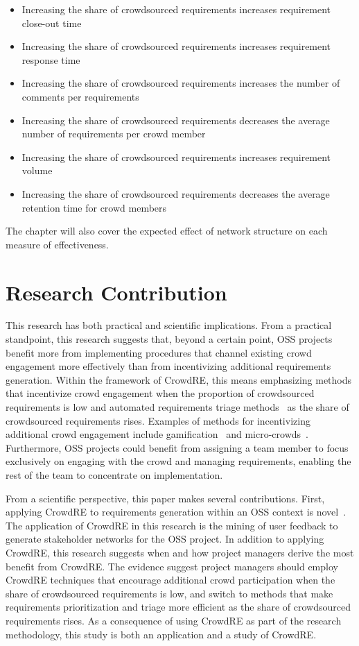 \begin{itemize}
    \item Increasing the share of crowdsourced requirements increases requirement close-out time
    \item Increasing the share of crowdsourced requirements increases requirement response time
    \item Increasing the share of crowdsourced requirements increases the number of comments per requirements
    \item Increasing the share of crowdsourced requirements decreases the average number of requirements per crowd member
    \item Increasing the share of crowdsourced requirements increases requirement volume
    \item Increasing the share of crowdsourced requirements decreases the average retention time for crowd members
\end{itemize}

The chapter will also cover the expected effect of network structure on each measure of effectiveness.

\section{Research Contribution}

This research has both practical and scientific implications. From a practical standpoint, this research suggests that, beyond a certain point, OSS projects benefit more from implementing procedures that channel existing crowd engagement more effectively than from incentivizing additional requirements generation. Within the framework of CrowdRE, this means emphasizing methods that incentivize crowd engagement when the proportion of crowdsourced requirements is low and automated requirements triage methods~\cite{stakesource, mobasher} as the share of crowdsourced requirements rises. Examples of methods for incentivizing additional crowd engagement include gamification~\cite{snijders, snijders2} and micro-crowds~\cite{levy}. Furthermore, OSS projects could benefit from assigning a team member to focus exclusively on engaging with the crowd and managing requirements, enabling the rest of the team to concentrate on implementation.

From a scientific perspective, this paper makes several contributions. First, applying CrowdRE to requirements generation within an OSS context is novel~\cite{glinz}. The application of CrowdRE in this research is the mining of user feedback to generate stakeholder networks for the OSS project. In addition to applying CrowdRE, this research suggests when and how project managers derive the most benefit from CrowdRE. The evidence suggest project managers should employ CrowdRE techniques that encourage additional crowd participation when the share of crowdsourced requirements is low, and switch to methods that make requirements prioritization and triage more efficient as the share of crowdsourced requirements rises. As a consequence of using CrowdRE as part of the research methodology, this study is both an application and a study of CrowdRE.


